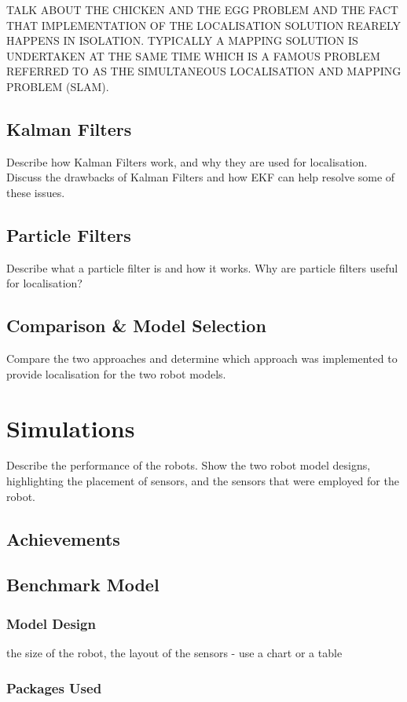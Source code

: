 \documentclass[a4paper]{article}
\begin{document}
TALK ABOUT THE CHICKEN AND THE EGG PROBLEM AND THE FACT THAT IMPLEMENTATION OF THE LOCALISATION SOLUTION REARELY HAPPENS IN ISOLATION. TYPICALLY A MAPPING SOLUTION IS UNDERTAKEN AT THE SAME TIME WHICH IS A FAMOUS PROBLEM REFERRED TO AS THE SIMULTANEOUS LOCALISATION AND MAPPING PROBLEM (SLAM).

\subsection{Kalman Filters}
Describe how Kalman Filters work, and why they are used for localisation. Discuss the drawbacks of Kalman Filters and how EKF can help resolve some of these issues.

\subsection{Particle Filters}
Describe what a particle filter is and how it works. Why are particle filters useful for localisation?

\subsection{Comparison \& Model Selection}
Compare the two approaches and determine which approach was implemented to provide localisation for the two robot models.

\section{Simulations}
Describe the performance of the robots. Show the two robot model designs, highlighting the placement of sensors, and the sensors that were employed for the robot.

\subsection{Achievements}

\subsection{Benchmark Model}
\subsubsection{Model Design}
the size of the robot, the layout of the sensors - use a chart or a table

\subsubsection{Packages Used}
\end{document}

